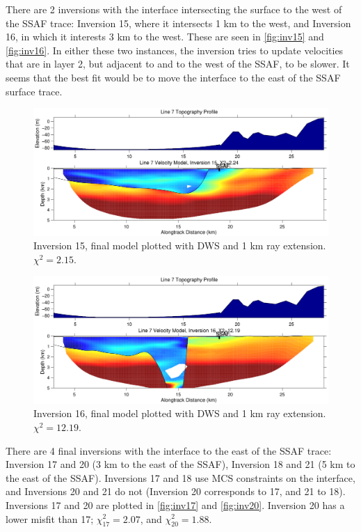 \documentclass[fontsize=11pt, %
                             paper=a4, %
                             twoside, %
                             captions=tableheading,
                             index=totoc,
                             hyperref]{labbook}
\begin{document}
\begin{addmargin}[4cm]{0cm}
There are 2 inversions with the interface intersecting the surface to the west of the SSAF trace: Inversion 15, where it intersects 1 km to the west, and Inversion 16, in which it interests 3 km to the west.  These are seen in \autoref{fig:inv15} and \autoref{fig:inv16}.  In either these two instances, the inversion tries to update velocities that are in layer 2, but adjacent to and to the west of the SSAF, to be slower.  It seems that the best fit would be to move the interface to the east of the SSAF surface trace.

\begin{figure}[h!]
\raggedleft
\includegraphics[scale=0.6,keepaspectratio=true]{figs/interface_figures/inv15.pdf}
\caption{Inversion 15, final model plotted with DWS and 1 km ray extension.  $\chi^2 = 2.15$.}
\label{fig:inv15}
\end{figure} 

\begin{figure}[h!]
\raggedleft
\includegraphics[scale=0.6,keepaspectratio=true]{figs/interface_figures/inv16.pdf}
\caption{Inversion 16, final model plotted with DWS and 1 km ray extension.  $\chi^2 = 12.19$.}
\label{fig:inv16}
\end{figure} 
 
There are 4 final inversions with the interface to the east of the SSAF trace: Inversion 17 and 20 (3 km to the east of the SSAF), Inversion 18 and 21 (5 km to the east of the SSAF).  Inversions 17 and 18 use MCS constraints on the interface, and Inversions 20 and 21 do not (Inversion 20 corresponds to 17, and 21 to 18).  Inversions 17 and 20 are plotted in \autoref{fig:inv17} and \autoref{fig:inv20}.  Inversion 20 has a lower misfit than 17; $\chi^2_{17} = 2.07$, and $\chi^2_{20} = 1.88$.  


\end{addmargin}
\end{document}

